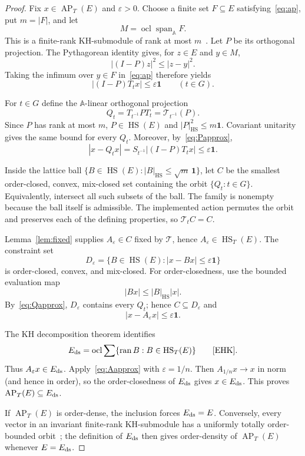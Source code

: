 \documentclass[11pt]{article}
\newcommand{\A}{\mathbb A}
\newcommand{\one}{\mathbf 1}
\newcommand{\HS}{\operatorname{HS}}
\newcommand{\ocl}{\operatorname{ocl}}
\newcommand{\AP}{\operatorname{AP}}
\newcommand{\ran}{\operatorname{ran}}
\begin{document}
\begin{proof}
Fix $x\in\AP_T(E)$ and $\varepsilon>0$.  Choose a finite set
$F\subseteq E$ satisfying~\eqref{eq:ap}, put $m=|F|$, and let
\[
 M=\ocl\operatorname{span}_{\A}F.
\]
This is a finite-rank KH-submodule of rank at most $m$~\cite[Sec. 2.5]{EHK}.
Let $P$ be its orthogonal projection.  The Pythagorean identity gives, for
$z\in E$ and $y\in M$,
\[
 |(I-P)z|^2\leq |z-y|^2.
\]
Taking the infimum over $y\in F$ in~\eqref{eq:ap} therefore yields
\begin{equation}\label{eq:Papprox}
 |(I-P)T_t x|\leq\varepsilon\one\qquad(t\in G).
\end{equation}

For $t\in G$ define the $\A$-linear orthogonal projection
\[
 Q_t=T_{t^{-1}}PT_t=\mathcal T_{t^{-1}}(P).
\]
Since $P$ has rank at most $m$, $P\in\HS(E)$ and
$|P|_{\HS}^2\leq m\one$.  Covariant unitarity gives the same bound for
every $Q_t$.  Moreover, by~\eqref{eq:Papprox},
\begin{equation}\label{eq:Qapprox}
 |x-Q_tx|
 =S_{t^{-1}}|(I-P)T_tx|
 \leq\varepsilon\one.
\end{equation}

Inside the lattice ball
$\{B\in\HS(E):|B|_{\HS}\leq\sqrt m\,\one\}$, let $C$ be the smallest
order-closed, convex, mix-closed set containing the orbit
$\{Q_t:t\in G\}$.  Equivalently, intersect all such subsets of the ball.
The family is nonempty because the ball itself is admissible.  The
implemented action permutes the orbit and preserves each of the defining
properties, so $\mathcal T_tC=C$.

Lemma~\ref{lem:fixed} supplies $A_\varepsilon\in C$ fixed by
$\mathcal T$, hence $A_\varepsilon\in\HS_T(E)$.  The constraint set
\[
 D_\varepsilon=\{B\in\HS(E):|x-Bx|\leq\varepsilon\one\}
\]
is order-closed, convex, and mix-closed.  For order-closedness, use the
bounded evaluation map
\[
 |Bx|\leq |B|_{\HS}|x|.
\]
By~\eqref{eq:Qapprox}, $D_\varepsilon$ contains every $Q_t$; hence
$C\subseteq D_\varepsilon$ and
\begin{equation}\label{eq:Aapprox}
 |x-A_\varepsilon x|\leq\varepsilon\one.
\end{equation}

The KH decomposition theorem identifies
\[
 E_{\rm ds}
 =\ocl\sum\{\ran B:B\in\HS_T(E)\}
 \qquad\text{\cite[Theorem 6.9]{EHK}}.
\]
Thus $A_\varepsilon x\in E_{\rm ds}$.  Apply~\eqref{eq:Aapprox} with
$\varepsilon=1/n$.  Then $A_{1/n}x\to x$ in norm (and hence in order),
so the order-closedness of $E_{\rm ds}$ gives $x\in E_{\rm ds}$.  This
proves $\AP_T(E)\subseteq E_{\rm ds}$.

If $\AP_T(E)$ is order-dense, the inclusion forces $E_{\rm ds}=E$.
Conversely, every vector in an invariant finite-rank KH-submodule has a
uniformly totally order-bounded orbit~\cite[Proposition 2.5]{HK}; the
definition of $E_{\rm ds}$ then gives order-density of $\AP_T(E)$ whenever
$E=E_{\rm ds}$.
\end{proof}
\end{document}
